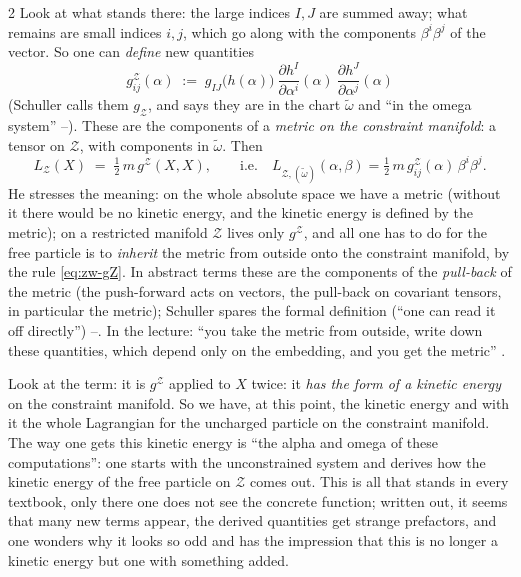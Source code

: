 \begin{paracol}{2}
Look at what stands there: the large indices $I,J$ are summed away; what remains are small indices $i,j$, which go along with the components $\beta^i\beta^j$ of the vector. So one can \emph{define} new quantities
\begin{equation}\label{eq:zw-gZ}
  g^{\mathcal Z}_{ij}(\alpha)\;:=\;g_{IJ}\bigl(h(\alpha)\bigr)\ \frac{\partial h^I}{\partial\alpha^i}(\alpha)\ \frac{\partial h^J}{\partial\alpha^j}(\alpha)
\end{equation}
(Schuller calls them $g_{\mathcal Z}$, and says they are in the chart $\tilde\omega$ and ``in the omega system'' --). These are the components of a \emph{metric on the constraint manifold}: a tensor on $\mathcal Z$, with components in $\tilde\omega$. Then
\begin{equation}\label{eq:zw-LZmetric}
  L_{\mathcal Z}(X)\;=\;\tfrac12\,m\,g^{\mathcal Z}(X,X),\qquad\text{i.e.}\quad L_{\mathcal Z,(\tilde\omega)}(\alpha,\beta)=\tfrac12\,m\,g^{\mathcal Z}_{ij}(\alpha)\,\beta^i\beta^j .
\end{equation}
He stresses the meaning: on the whole absolute space we have a metric (without it there would be no kinetic energy, and the kinetic energy is defined by the metric); on a restricted manifold $\mathcal Z$ lives only $g^{\mathcal Z}$, and all one has to do for the free particle is to \emph{inherit} the metric from outside onto the constraint manifold, by the rule \eqref{eq:zw-gZ}. In abstract terms these are the components of the \emph{pull-back} of the metric (the push-forward acts on vectors, the pull-back on covariant tensors, in particular the metric); Schuller spares the formal definition (``one can read it off directly'') --. In the lecture: ``you take the metric from outside, write down these quantities, which depend only on the embedding, and you get the metric'' .

\begin{intuition}[It is again a kinetic energy: $L=T-V$ is always true]\label{int:zw-kinetic}
Look at the term: it is $g^{\mathcal Z}$ applied to $X$ twice: it \emph{has the form of a kinetic energy} on the constraint manifold. So we have, at this point, the kinetic energy and with it the whole Lagrangian for the uncharged particle on the constraint manifold. The way one gets this kinetic energy is ``the alpha and omega of these computations'': one starts with the unconstrained system and derives how the kinetic energy of the free particle on $\mathcal Z$ comes out. This is all that stands in every textbook, only there one does not see the concrete function; written out, it seems that many new terms appear, the derived quantities get strange prefactors, and one wonders why it looks so odd and has the impression that this is no longer a kinetic energy but one with something added.


\end{intuition}
\end{paracol}
